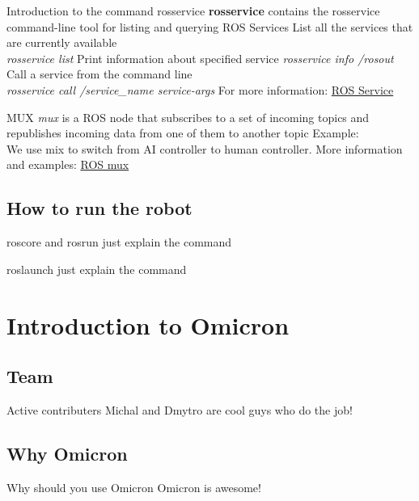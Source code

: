 \documentclass{beamer}
\begin{document}
\begin{frame}{Introduction to the command rosservice}
\textbf{rosservice} contains the rosservice command-line tool for listing and querying ROS Services
\vfill
List all the services that are currently available\\
\textit{rosservice list}
\vfill
Print information about specified service
\textit{rosservice info /rosout}
\vfill
Call a service from the command line\\
\textit{rosservice call /service\_name service-args}
\vfill
For more information: \href{http://wiki.ros.org/rosservice}{ROS Service}
\end{frame}

\begin{frame}{MUX}
\textit{mux} is a ROS node that subscribes to a set of incoming topics and republishes incoming data from one of them to another topic
\vfill
Example:\\
We use mix to switch from AI controller to human controller.
\vfill
More information and examples: \href{http://wiki.ros.org/topic_tools/mux}{ROS mux}
\end{frame}

\subsection{How to run the robot}
\begin{frame}{roscore and rosrun}
just explain the command
\end{frame}

\begin{frame}{roslaunch}
just explain the command
\end{frame}

\section{Introduction to Omicron}
\subsection{Team}
\begin{frame}{Active contributers}
Michal and Dmytro are cool guys who do the job!
\end{frame}

\subsection{Why Omicron}
\begin{frame}{Why should you use Omicron}
Omicron is awesome!
\end{frame}
\end{document}

